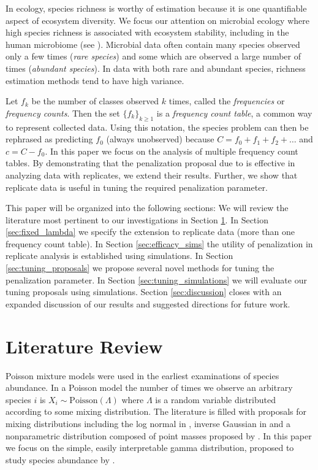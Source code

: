 \documentclass[oupdraft]{bio}
\begin{document}
In ecology, species richness is worthy of estimation because it is one quantifiable aspect of ecosystem diversity.  We focus our attention on microbial ecology where high species richness is associated with ecosystem stability, including in the human microbiome (see \citet{sekirov2010gut}). Microbial data often contain many species observed only a few times (\textit{rare species}) and some which are observed a large number of times (\textit{abundant species}).  In data with both rare and abundant species, richness estimation methods tend to have high variance.

Let $f_k$ be the number of classes observed $k$ times, called the \textit{frequencies} or \textit{frequency counts}.  Then the set $\{f_k\}_{k \geq 1}$ is a \textit{frequency count table}, a common way to represent collected data.  Using this notation, the species problem can then be rephrased as predicting $f_0$ (always unobserved) because $C = f_0 + f_1 + f_2 + \dots$ and $c = C - f_0$.  In this paper we focus on the analysis of multiple frequency count tables.  By demonstrating that the penalization proposal due to \citet{wang_2005} is effective in analyzing data with replicates, we extend their results.  Further, we show that replicate data is useful in tuning the required penalization parameter.

This paper will be organized into the following sections:  We will review the literature most pertinent to our investigations in Section \ref{sec:literature_review}.  In Section \ref{sec:fixed_lambda} we specify the  extension to replicate data (more than one frequency count table).  In Section \ref{sec:efficacy_sims} the utility of penalization in replicate analysis is established using simulations.  In Section \ref{sec:tuning_proposals} we propose several novel methods for tuning the penalization parameter.  In Section \ref{sec:tuning_simulations} we will evaluate our tuning proposals using simulations.  Section \ref{sec:discussion} closes with an expanded discussion of our results and suggested directions for future work.

\section{Literature Review}
\label{sec:literature_review}

Poisson mixture models were used in the earliest examinations of species abundance.  In a Poisson model the number of times we observe an arbitrary species $i$ is $X_i \sim \text{Poisson}(\Lambda)$ where $\Lambda$ is a random variable distributed according to some mixing distribution.  The literature is filled with proposals for mixing distributions including the log normal in \citet{bulmer_1974}, inverse Gaussian in \citet{ord_1986} and a nonparametric distribution composed of point masses proposed by \citet{norris_1998}.  In this paper we focus on the simple, easily interpretable gamma distribution, proposed to study species abundance by \citet{fisher_1943}.
\end{document}
